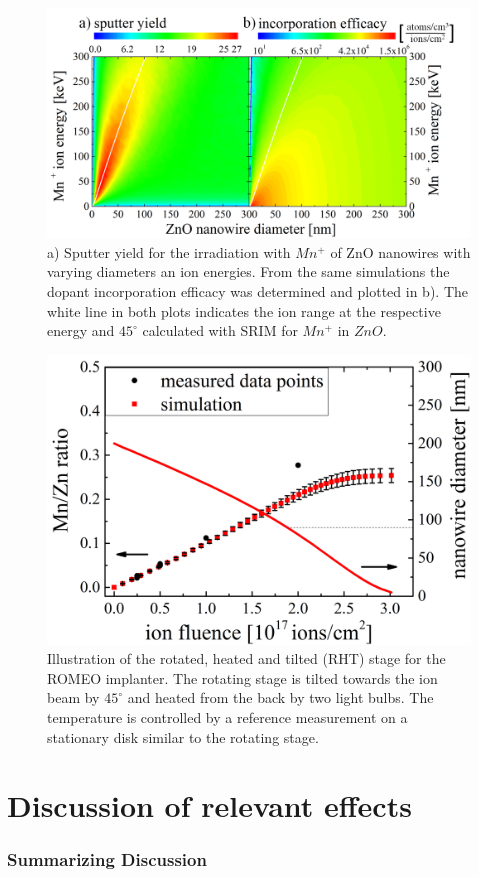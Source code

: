 \begin{figure}
	\centering
		\includegraphics[width=.85\textwidth]{images/sputterincorporate.png}
	\caption{a) Sputter yield for the irradiation with $Mn^+$ of ZnO nanowires with varying diameters an ion energies. From the same simulations the dopant incorporation efficacy was determined and plotted in b). The white line in both plots indicates the ion range at the respective energy and $45^\circ$ calculated with SRIM for $Mn^+$ in $ZnO$.}
	\label{sputterincorporate}
\end{figure} 


\begin{figure}
	\centering
		\includegraphics[width=.5\textwidth]{images/pseudodynamic.png}
	\caption{Illustration of the rotated, heated and tilted (RHT) stage for the ROMEO implanter. The rotating stage is tilted towards the ion beam by $45^\circ$ and heated from the back by two light bulbs. The temperature is controlled by a reference measurement on a stationary disk similar to the rotating stage.}
	\label{pseudodynamic}
\end{figure} 

\section{Discussion of relevant effects}

\subsubsection{Summarizing Discussion}